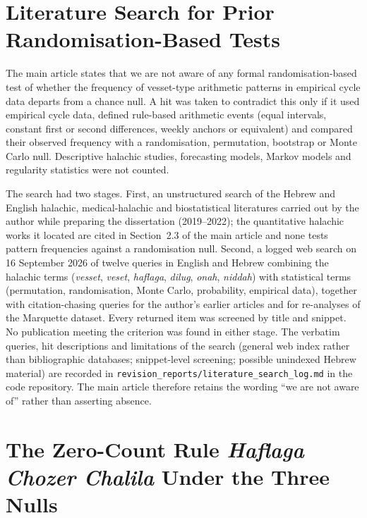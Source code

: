 \documentclass[12pt]{article}
\begin{document}
\section{Literature Search for Prior Randomisation-Based Tests}
\label{sec:si-litsearch}

The main article states that we are not aware of any formal randomisation-based test of
whether the frequency of vesset-type arithmetic patterns in empirical cycle data departs
from a chance null. A hit was taken to contradict this only if it used empirical cycle
data, defined rule-based arithmetic events (equal intervals, constant first or second
differences, weekly anchors or equivalent) and compared their observed frequency with a
randomisation, permutation, bootstrap or Monte Carlo null. Descriptive halachic studies,
forecasting models, Markov models and regularity statistics were not counted.

The search had two stages. First, an unstructured search of the Hebrew and English
halachic, medical-halachic and biostatistical literatures carried out by the author while
preparing the dissertation (2019--2022); the quantitative halachic works it located are
cited in Section~2.3 of the main article and none tests pattern frequencies against a
randomisation null. Second, a logged web search on 16 September 2026 of twelve queries in
English and Hebrew combining the halachic terms (\textit{vesset}, \textit{veset},
\textit{haflaga}, \textit{dilug}, \textit{onah}, \textit{niddah}) with statistical
terms (permutation, randomisation, Monte Carlo, probability, empirical data), together
with citation-chasing queries for the author's earlier articles and for re-analyses of the
Marquette dataset. Every returned item was screened by title and snippet. No publication
meeting the criterion was found in either stage. The verbatim queries, hit descriptions
and limitations of the search (general web index rather than bibliographic databases;
snippet-level screening; possible unindexed Hebrew material) are recorded in
\texttt{revision\_reports/literature\_search\_log.md} in the code repository. The
main article therefore retains the wording ``we are not aware of'' rather than asserting
absence.

\section{The Zero-Count Rule \textit{Haflaga Chozer Chalila} Under the Three Nulls}
\label{sec:si-hcc}
\end{document}
